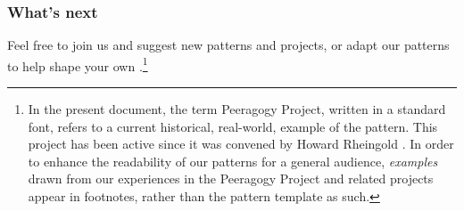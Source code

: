\subsubsection*{What's next}    
Feel free to join us and suggest new patterns and projects, or adapt our patterns to help shape your own .\footnote{In the present document, the term Peeragogy Project, written in a standard font, refers to a current historical, real-world, example of the  pattern. This project has been active since it was convened by Howard Rheingold \cite{howard-rheingold-lecture}. In order to enhance the readability of our patterns for a general audience, \emph{examples} drawn from our experiences in the Peeragogy Project and related projects appear in footnotes, rather than the pattern template as such.}
